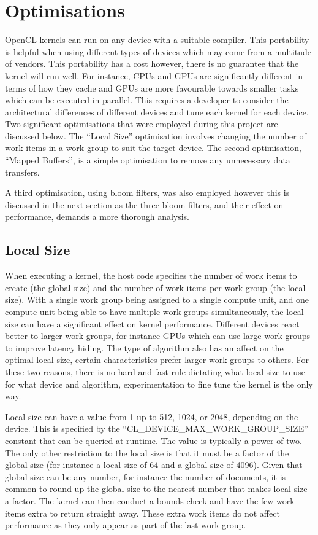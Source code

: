 \section{Optimisations}

OpenCL kernels can run on any device with a suitable compiler. This portability
is helpful when using different types of devices which may come from a multitude
of vendors. This portability has a cost however, there is no guarantee that the
kernel will run well. For instance, CPUs and GPUs are significantly different in
terms of how they cache and GPUs are more favourable towards smaller tasks which
can be executed in parallel. This requires a developer to consider the
architectural differences of different devices and tune each kernel for each
device. Two significant optimisations that were employed during this project are
discussed below. The ``Local Size'' optimisation involves changing the number of
work items in a work group to suit the target device. The second optimisation,
``Mapped Buffers'', is a simple optimisation to remove any unnecessary data
transfers.

A third optimisation, using bloom filters, was also employed however this is
discussed in the next section as the three bloom filters, and their effect on
performance, demands a more thorough analysis.

\subsection{Local Size}

When executing a kernel, the host code specifies the number of work items to
create (the global size) and the number of work items per work group (the local
size). With a single work group being assigned to a single compute unit, and one
compute unit being able to have multiple work groups simultaneously, the local
size can have a significant effect on kernel performance. Different devices
react better to larger work groups, for instance GPUs which can use large work
groups to improve latency hiding. The type of algorithm also has an affect on
the optimal local size, certain characteristics prefer larger work groups to
others. For these two reasons, there is no hard and fast rule dictating what
local size to use for what device and algorithm, experimentation to fine tune
the kernel is the only way.

Local size can have a value from 1 up to 512, 1024, or 2048, depending on the
device. This is specified by the ``CL\_DEVICE\_MAX\_WORK\_GROUP\_SIZE'' constant
that can be queried at runtime. The value is typically a power of two. The only
other restriction to the local size is that it must be a factor of the global
size (for instance a local size of 64 and a global size of 4096). Given that
global size can be any number, for instance the number of documents, it is
common to round up the global size to the nearest number that makes local size a
factor. The kernel can then conduct a bounds check and have the few work items
extra to return straight away. These extra work items do not affect performance
as they only appear as part of the last work group.

